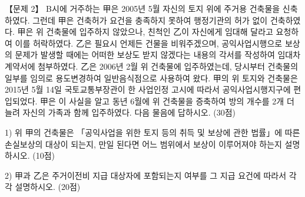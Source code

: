 \begin{longquestion}{【문제 2】}
B시에 거주하는 甲은 2005년 5월 자신의 토지 위에 주거용 건축물을 신축하였다. 그런데 甲은 건축허가 요건을 충족하지 못하여 행정기관의 허가 없이 건축하였다. 甲은 위 건축물에 입주하지 않았으나, 친척인 乙이 자신에게 임대해 달라고 요청하여 이를 허락하였다. 乙은 필요시 언제든 건물을 비워주겠으며, 공익사업시행으로 보상의 문제가 발생할 때에는 어떠한 보상도 받지 않겠다는 내용의 각서를 작성하여 임대차계약서에 첨부하였다. 乙은 2006년 2월 위 건축물에 입주하였는데, 당시부터 건축물의 일부를 임의로 용도변경하여 일반음식점으로 사용하여 왔다. 甲의 위 토지와 건축물은 2015년 5월 14일 국토교통부장관이 한 사업인정 고시에 따라서 공익사업시행지구에 편입되었다. 甲은 이 사실을 알고 동년 6월에 위 건축물을 증축하여 방의 개수를 2개 더 늘려 자신의 가족과 함께 입주하였다. 다음 물음에 답하시오. (30점) \par
1) 위 甲의 건축물은 「공익사업을 위한 토지 등의 취득 및 보상에 관한 법률」에 따른 손실보상의 대상이 되는지, 만일 된다면 어느 범위에서 보상이 이루어져야 하는지 설명하시오. (10점) \par
2) 甲과 乙은 주거이전비 지급 대상자에 포함되는지 여부를 그 지급 요건에 따라서 각각 설명하시오. (20점) \par
\end{longquestion}
